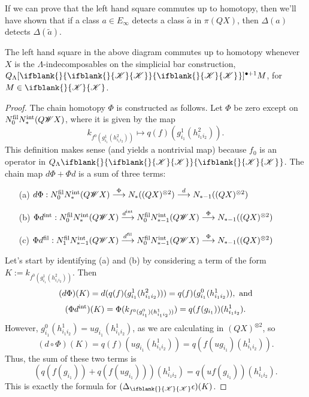 \documentclass[10pt]{article}
\newcommand{\LL}[1]{\ifblank{#1}{\scrK}{\scrK^{#1}}}
\newcommand{\Fr}[2][]{\ifblank{#1}{#2}{#2_{#1}}}
\renewcommand{\Q}{Q}
\begin{document}
\begin{Grothendieck Multiplicativity}
If we can prove that the left hand square commutes up to homotopy, then we'll have shown that if a class $a\in E_{\infty}$ detects a class $\widetilde{a}$ in $\pi(QX)$, then $\Delta(a)$ detects $\Delta(\widetilde{a})$.
\begin{prop}
The left hand square in the above diagram commutes up to homotopy whenever $X$ is the $\Lambda$-indecomposables on the simplicial bar construction, $\Q_{\Lambda}[\Fr{\LL{}}]^{\bullet+1}M$, for $M\in\LL{}$.
\end{prop}
\begin{proof}
The chain homotopy $\Phi$ is constructed as follows. Let $\Phi$ be zero except on $N_0^\textup{fil}N_*^\textup{int}(Q\scrW X)$, where it is given by the map
\[k_{f^0(g^1_{i_1}(h^2_{i_1i_2}))}\mapsto q(f)(g^1_{i_1}(h^2_{i_1i_2})).\]
This definition makes sense (and yields a nontrivial map) because $f_0$ is an operator in $Q_{\Lambda}\Fr{\LL{}}$.
The chain map $d\Phi+\Phi d$ is a sum of three terms:
\begin{enumerate}\squishlist
\setlength{\parindent}{.25in}
\item[(a)] $d\circ\Phi:N_0^\textup{fil}N_*^\textup{int}(Q\scrW X)\overset{\Phi}{\to} N_*((QX)^{\otimes2})\overset{d}{\to} N_{*-1}((QX)^{\otimes2})$
\item[(b)] $\Phi\circ d^\textup{int}:N_0^\textup{fil}N_{*}^\textup{int}(Q\scrW X)\overset{d^\textup{int}}{\to} N_0^\textup{fil}N_{*-1}^\textup{int}(Q\scrW X)\overset{\Phi}{\to} N_{*-1}((QX)^{\otimes2})$
\item[(c)] $\Phi\circ d^\textup{fil}:N_1^\textup{fil}N_{*-1}^\textup{int}(Q\scrW X)\overset{d^\textup{fil}}{\to} N_0^\textup{fil}N_{*-1}^\textup{int}(Q\scrW X)\overset{\Phi}{\to} N_{*-1}((QX)^{\otimes2})$
\end{enumerate}
Let's start by identifying (a) and (b) by considering a term of the form $K:=k_{f^0(g^1_{i_1}(h^2_{i_1i_2}))}$. Then
\[(d\circ\Phi)(K)=d( q(f)(g^1_{i_1}(h^2_{i_1i_2})))=q(f)(g^0_{i_1}(h^1_{i_1i_2})),\textup{ and}\]
\[(\Phi\circ d^\textup{int})(K)=\Phi( k_{f^0(g^0_{i_1})(h^1_{i_1i_2}))})=q(f(g_{i_1}))(h^1_{i_1i_2}).\]
However, $g^0_{i_1}(h^1_{i_1i_2})=ug_{i_1}(h^1_{i_1i_2})$, as we are calculating in $(QX)^{\otimes2}$, so
\[(d\circ\Phi)(K)=q(f)(ug_{i_1}(h^1_{i_1i_2}))=q(f(ug_{i_1})(h^1_{i_1i_2})).\]
Thus, the sum of these two terms is
\[\left(q(f(g_{i_1}))+q(f(ug_{i_1}))\right)(h^1_{i_1i_2})=q(uf(g_{i_1}))(h^1_{i_1i_2}).\]
This is exactly the formula for $(\Delta_{\LL{}}\circ\epsilon)(K)$.


\end{proof}
\end{Grothendieck Multiplicativity}
\end{document}
